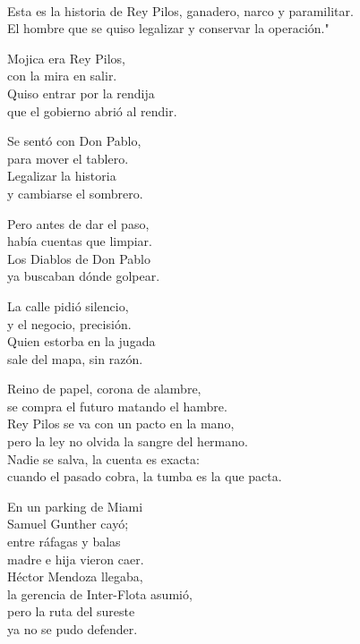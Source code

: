\begin{lyrics}

\\
Esta es la historia de Rey Pilos, ganadero, narco y paramilitar.\\
El hombre que se quiso legalizar y conservar la operación."

Mojica era Rey Pilos,\\
con la mira en salir.\\
Quiso entrar por la rendija\\
que el gobierno abrió al rendir.

Se sentó con Don Pablo,\\
para mover el tablero.\\
Legalizar la historia\\
y cambiarse el sombrero.

Pero antes de dar el paso,\\
había cuentas que limpiar.\\
Los Diablos de Don Pablo\\
ya buscaban dónde golpear.

La calle pidió silencio,\\
y el negocio, precisión.\\
Quien estorba en la jugada\\
sale del mapa, sin razón.

Reino de papel, corona de alambre,\\
se compra el futuro matando el hambre.\\
Rey Pilos se va con un pacto en la mano,\\
pero la ley no olvida la sangre del hermano.\\
Nadie se salva, la cuenta es exacta:\\
cuando el pasado cobra, la tumba es la que pacta.

En un parking de Miami\\
Samuel Gunther cayó;\\
entre ráfagas y balas\\
madre e hija vieron caer.\\
Héctor Mendoza llegaba,\\
la gerencia de Inter-Flota asumió,\\
pero la ruta del sureste\\
ya no se pudo defender.


\end{lyrics}
